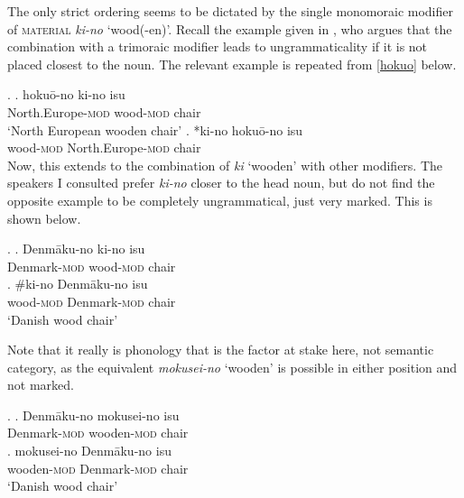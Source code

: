 \documentclass [output=book,colorlinks,citecolor=brown]{langscibook}
\begin{document}
The only strict ordering seems to be dictated by the single monomoraic modifier of \textsc{material} \textit{ki-no} `wood(-en)’. Recall the example given in \citet{watanabe:2012:direct}, who argues that the combination with a trimoraic modifier leads to ungrammaticality if it is not placed closest to the noun. The relevant example is repeated from \ref{hokuo} below.

\ex. \ag. hokuō-no ki-no isu \\
North.Europe-\textsc{mod} wood-\textsc{mod} chair\\
`North European wooden chair' 
\bg. *ki-no hokuō-no isu\\
wood-\textsc{mod} North.Europe-\textsc{mod} chair \hfill \citep[508]{watanabe:2012:direct} \\

Now, this extends to the combination of \textit{ki} `wooden’ with other modifiers. The speakers I consulted prefer \textit{ki-no} closer to the head noun, but do not find the opposite example to be completely ungrammatical, just very marked. This is shown below. %

\ex. \ag. Denmāku-no ki-no isu\\
Denmark-\textsc{mod} wood-\textsc{mod} chair\\
\bg. \#ki-no Denmāku-no isu\\
wood-\textsc{mod} Denmark-\textsc{mod} chair\\
`Danish wood chair'

Note that it really is phonology that is the factor at stake here, not semantic category, as the equivalent \textit{mokusei-no} `wooden’ is possible in either position and not marked.


\ex. \ag. Denmāku-no mokusei-no isu\\
Denmark-\textsc{mod} wooden-\textsc{mod} chair\\
\bg. mokusei-no Denmāku-no isu\\
wooden-\textsc{mod} Denmark-\textsc{mod} chair\\
`Danish wood chair'
\end{document}
